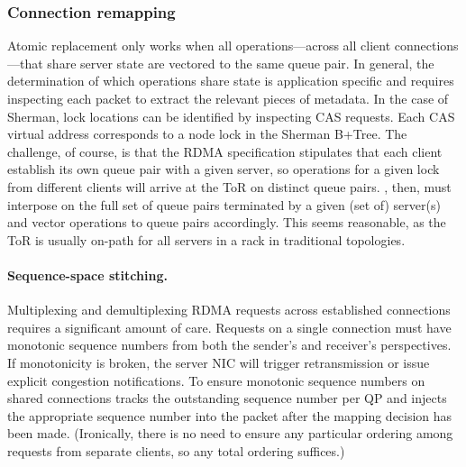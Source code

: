 

\subsubsection{Connection remapping}

Atomic replacement only works when all operations---across all client
connections---that share server state are vectored to the same queue pair.  In
general, the determination of which operations share state is application
specific and requires inspecting each packet to extract the relevant pieces
of metadata. In the case of Sherman, lock locations can be identified by
inspecting CAS requests. Each CAS virtual address corresponds to a node lock in
the Sherman B+Tree.
The challenge, of course, is that the RDMA specification stipulates that each
client establish its own queue pair with a given server, so operations for a
given lock from different clients will arrive at the ToR on distinct queue
pairs.  \sword, then, must interpose on the full set of queue pairs terminated
by a given (set of) server(s) and vector operations to queue pairs accordingly.
This seems reasonable, as the ToR is usually on-path for all servers in a rack
in traditional topologies.

\paragraph{Sequence-space stitching.}

Multiplexing and demultiplexing RDMA requests across established
connections requires a significant amount of care. Requests on a
single connection must have monotonic sequence numbers from both the
sender's and receiver's perspectives. If monotonicity is broken, the
server NIC will trigger retransmission or issue explicit congestion
notifications. To ensure monotonic sequence numbers on shared
connections {\sword} tracks the outstanding sequence number per QP and
injects the appropriate sequence number into the packet after the
mapping decision has been made.  (Ironically, there is no need to
ensure any particular ordering among requests from separate clients,
so any total ordering suffices.)

